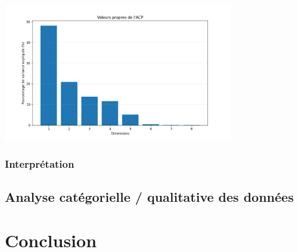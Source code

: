 \documentclass[11pt]{scrartcl}
\begin{document}
                \begin{center}
                    \includegraphics[width=0.75\textwidth]{images/valeurs_propres_ACP.png}
                \end{center}

            \subsubsection{Interprétation}

        
    \subsection{Analyse catégorielle / qualitative des données}




    \section{Conclusion}
\end{document}
